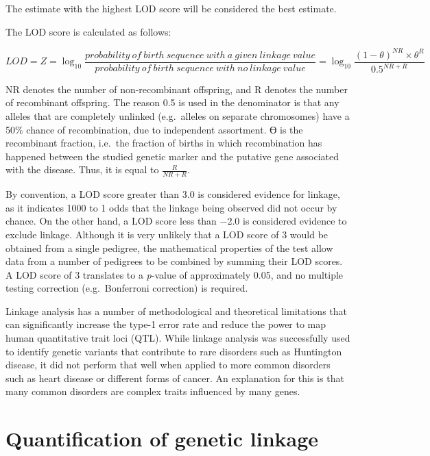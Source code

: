 The estimate with the highest LOD score will be considered the best estimate.

The LOD score is calculated as follows:

\[LOD = Z = \log_{10}\frac{probability\ of\ birth\ sequence\ with\ a\ given\ linkage\ value}{probability\ of\ birth\ sequence\ with\ no\ linkage\ value} = \log_{10}\frac{(1-\theta)^{NR} \times \theta^R}{0.5^{NR+R}}\]

NR denotes the number of non-recombinant offspring, and R denotes the number of recombinant offspring. The reason 0.5 is used in the denominator is that any alleles that are completely unlinked (e.g.~alleles on separate chromosomes) have a 50\% chance of recombination, due to independent assortment. ϴ is the recombinant fraction, i.e.~the fraction of births in which recombination has happened between the studied genetic marker and the putative gene associated with the disease. Thus, it is equal to \(\frac{R}{NR+R}\).

By convention, a LOD score greater than 3.0 is considered evidence for linkage, as it indicates 1000 to 1 odds that the linkage being observed did not occur by chance. On the other hand, a LOD score less than −2.0 is considered evidence to exclude linkage. Although it is very unlikely that a LOD score of 3 would be obtained from a single pedigree, the mathematical properties of the test allow data from a number of pedigrees to be combined by summing their LOD scores. A LOD score of 3 translates to a \emph{p}-value of approximately 0.05, and no multiple testing correction (e.g.~Bonferroni correction) is required.

Linkage analysis has a number of methodological and theoretical limitations that can significantly increase the type-1 error rate and reduce the power to map human quantitative trait loci (QTL). While linkage analysis was successfully used to identify genetic variants that contribute to rare disorders such as Huntington disease, it did not perform that well when applied to more common disorders such as heart disease or different forms of cancer. An explanation for this is that many common disorders are complex traits influenced by many genes.

\hypertarget{quantification-of-genetic-linkage}{%
\section{Quantification of genetic linkage}\label{quantification-of-genetic-linkage}}

